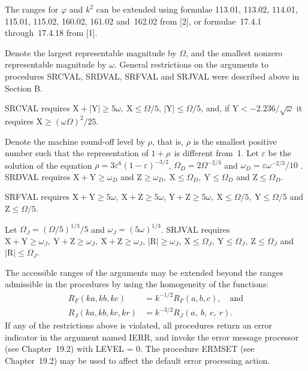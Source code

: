 \documentclass[twoside]{MATH77}
\begin{document}
The ranges for $\varphi $ and $k^2$ can be extended using formulae 113.01,
113.02, 114.01, 115.01, 115.02, 160.02, 161.02 and~162.02 from [2],
or formulae~17.4.1 through~17.4.18 from [1].

Denote the largest representable magnitude by $\Omega $, and the smallest
nonzero representable magnitude by $\omega $. General restrictions on the
arguments to procedures SRCVAL, SRDVAL, SRFVAL and SRJVAL were described
above in Section B.

SRCVAL requires $\text{X}+|\text{Y}| \geq 5\omega ,\ \text{X} \leq
\Omega /5$, $|\text{Y}| \leq \Omega /5$, and, if $\text{Y} < -2.236/\sqrt
\omega $ it requires $\text{X} \geq (\omega \Omega )^2/25$.

Denote the machine round-off level by $\rho $, that is, $\rho $ is the
smallest positive number such that
the representation of $1+\rho $\ is different from~1. Let $\varepsilon $ be
the solution of the equation $\rho = 3\varepsilon ^6(1-\varepsilon )^{-3/2}$,
$\Omega _D = 2\Omega ^{-2/3}$ and $\omega _D = \varepsilon \omega ^{-2/3}/10$%
. SRDVAL requires $\text{X}+\text{Y} \geq \omega _D$ and $\text{Z}
\geq \omega _D,\ \text{X} \leq  \Omega _D,\ \text{Y} \leq \Omega _D$
and $\text{Z} \leq \Omega _D$.

SRFVAL requires $\text{X} + \text{Y} \geq 5\omega ,\ \text{X} +
\text{Z} \geq 5\omega $, $\text{Y} + \text{Z} \geq 5\omega ,\ \text{X} \leq
\Omega /5,\ \text{Y} \leq \Omega /5$ and
$\text{Z} \leq \Omega /5$.

Let $\Omega _J = (\Omega /5)^{1/3}/5$ and $\omega _J = (5\omega )^{1/3}$.
SRJVAL requires $\text{X}+\text{Y} \geq \omega _J,\ \text{Y} +\text{Z}\geq
\omega _J,\ \text{X} +\text{Z} \geq \omega _J$, $|\text{R}| \geq
\omega _J,\ \text{X} \leq \Omega _J,\ \text{Y} \leq \Omega _J,\ \text{Z} \leq
\Omega _J$ and $|\text{R}| \leq \Omega _J$.

The accessible ranges of the
arguments may be extended beyond the ranges admissible in the procedures by
using the homogeneity of the functions:
\begin{align*}
R_F(ka, kb, kc) &= k^{-1/2} R_F(a, b, c),\quad \text{and}\\
R_J(ka,kb, kc, kr) &= k^{-3/2} R_J(a,\ b,\ c,\ r).
\end{align*}
If any of the restrictions above is violated, all procedures return an error
indicator in the argument named IERR, and invoke the error message
processor (see Chapter~19.2) with LEVEL = 0. The procedure ERMSET (see
Chapter~19.2) may be used to affect the default error processing action.
\end{document}
